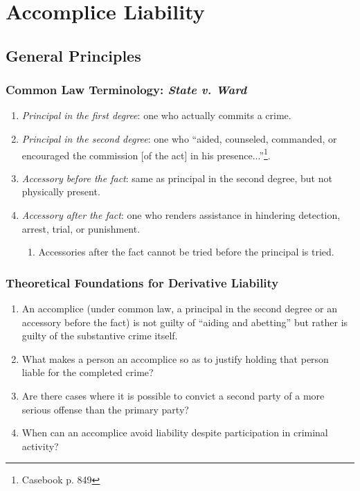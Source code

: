 \section{Accomplice Liability}

\subsection{General Principles}

\subsubsection{Common Law Terminology: \emph{State v. Ward}}

\begin{enumerate}
    \item \emph{Principal in the first degree}: one who actually commits a 
    crime.
    \item \emph{Principal in the second degree}: one who ``aided, counseled, 
    commanded, or encouraged the commission [of the act] in his 
    presence...''\footnote{Casebook p. 849}.
    \item \emph{Accessory before the fact}: same as principal in the second 
    degree, but not physically present.
    \item \emph{Accessory after the fact}: one who renders assistance in 
    hindering detection, arrest, trial, or punishment.
    \begin{enumerate}
        \item Accessories after the fact cannot be tried before the principal 
        is tried.
    \end{enumerate}
\end{enumerate}

\subsubsection{Theoretical Foundations for Derivative Liability}

\begin{enumerate}
    \item An accomplice (under common law, a principal in the second degree or 
    an accessory before the fact) is not guilty of ``aiding and abetting'' but 
    rather is guilty of the substantive crime itself.
    \item What makes a person an accomplice so as to justify holding that 
    person liable for the completed crime?
    \item Are there cases where it is possible to convict a second party of a 
    more serious offense than the primary party?
    \item When can an accomplice avoid liability despite participation in 
    criminal activity?
\end{enumerate}

